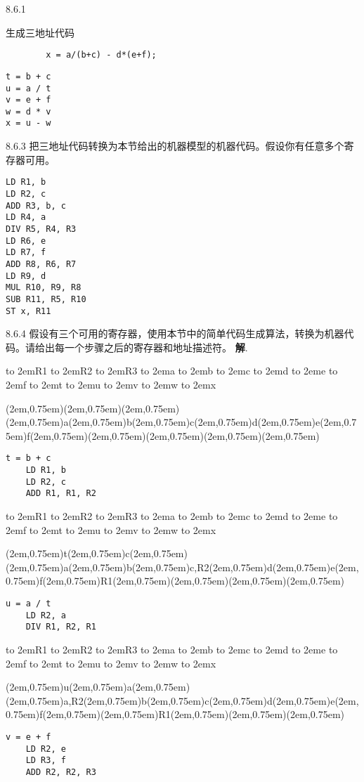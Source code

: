 \documentclass[a4paper]{article}
\newenvironment{problems}{\begin{list}{}{\renewcommand{\makelabel}[1]{\textbf{##1}\hfil}}}{\end{list}}
\newenvironment{steps}{\begin{list}{}{\renewcommand{\makelabel}[1]{##1)\hfil}}}{\end{list}}
\providecommand{\sol}{\textbf{解}.~}
\def\slot#1{\framebox(2em,0.75em){#1}}
\def\lab#1{\hbox to 2em{\hfil #1 \hfil}}
\def\heading{\hfill \lab{R1}\lab{R2}\lab{R3}\hspace*{2em}\lab{a}\lab{b}\lab{c}\lab{d}\lab{e}\lab{f}\lab{t}\lab{u}\lab{v}\lab{w}\lab{x}}
\begin{document}
\begin{problems}
\begin{steps}
    \end{steps}

    \item[8.6.1] 
    \begin{multicols}{2}
    生成三地址代码
    \begin{verbatim}
        x = a/(b+c) - d*(e+f);
    \end{verbatim} 
    \begin{lstlisting}
t = b + c
u = a / t
v = e + f
w = d * v
x = u - w
    \end{lstlisting}
\end{multicols}
    \item[8.6.3] 把三地址代码转换为本节给出的机器模型的机器代码。假设你有任意多个寄存器可用。
    \begin{lstlisting}
LD R1, b
LD R2, c
ADD R3, b, c
LD R4, a
DIV R5, R4, R3
LD R6, e
LD R7, f
ADD R8, R6, R7
LD R9, d
MUL R10, R9, R8
SUB R11, R5, R10
ST x, R11
    \end{lstlisting} 
    \item[8.6.4] 假设有三个可用的寄存器，使用本节中的简单代码生成算法，转换为机器代码。请给出每一个步骤之后的寄存器和地址描述符。
    \sol

{\ttfamily
        \heading

        \hfill \slot{}\slot{}\slot{}\hspace*{2em}\slot{a}\slot{b}\slot{c}\slot{d}\slot{e}\slot{f}\slot{}\slot{}\slot{}\slot{}\slot{}
        
        \begin{verbatim}
t = b + c
    LD R1, b
    LD R2, c
    ADD R1, R1, R2
        \end{verbatim}

        \heading

        \hfill \slot{t}\slot{c}\slot{}\hspace*{2em}\slot{a}\slot{b}\slot{c,R2}\slot{d}\slot{e}\slot{f}\slot{R1}\slot{}\slot{}\slot{}\slot{}

        \begin{verbatim}
u = a / t
    LD R2, a
    DIV R1, R2, R1
        \end{verbatim}

        \heading

        \hfill \slot{u}\slot{a}\slot{}\hspace*{2em}\slot{a,R2}\slot{b}\slot{c}\slot{d}\slot{e}\slot{f}\slot{}\slot{R1}\slot{}\slot{}\slot{}

        \begin{verbatim}
v = e + f
    LD R2, e
    LD R3, f
    ADD R2, R2, R3
        \end{verbatim}

}
\end{problems}
\end{document}
